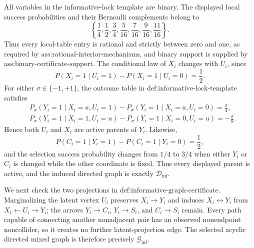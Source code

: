 All variables in the informative-lock template are binary.  The displayed local success probabilities and their Bernoulli complements belong to
\[
 \left\{\frac14,\frac12,\frac34,
              \frac5{16},\frac7{16},\frac9{16},\frac{11}{16}\right\}.
\]
Thus every local-table entry is rational and strictly between zero and one, as required by \(\text{ass:rational-interior-mechanisms}\), and binary support is supplied by \(\text{ass:binary-certificate-support}\).  The conditional law of \(X_i\) changes with \(U_i\), since
\[
 P(X_i=1\mid U_i=1)-P(X_i=1\mid U_i=0)=\frac12.
\]
For either \(\sigma\in\{-1,+1\}\), the outcome table in \(\text{def:informative-lock-template}\) satisfies
\[
 \begin{aligned}
 &P_\sigma(Y_i=1\mid X_i=a,U_i=1)
   -P_\sigma(Y_i=1\mid X_i=a,U_i=0)=\frac{\sigma}{4},\\
 &P_\sigma(Y_i=1\mid X_i=1,U_i=u)
   -P_\sigma(Y_i=1\mid X_i=0,U_i=u)=-\frac{\sigma}{8}.
 \end{aligned}
\]
Hence both \(U_i\) and \(X_i\) are active parents of \(Y_i\).  Likewise,
\[
 P(C_i=1\mid Y_i=1)-P(C_i=1\mid Y_i=0)=\frac12,
\]
and the selection success probability changes from \(1/4\) to \(3/4\) when either \(Y_i\) or \(C_i\) is changed while the other coordinate is fixed.  Thus every displayed parent is active, and the induced directed graph is exactly \(\mathcal D_{\mathrm{inf}}\).

We next check the two projections in \(\text{def:informative-graph-certificate}\).  Marginalizing the latent vertex \(U_i\) preserves \(X_i\to Y_i\) and induces \(X_i\leftrightarrow Y_i\) from \(X_i\leftarrow U_i\to Y_i\); the arrows \(Y_i\to C_i\), \(Y_i\to S_i\), and \(C_i\to S_i\) remain.  Every path capable of connecting another nonadjacent pair has an observed nonendpoint noncollider, so it creates no further latent-projection edge.  The selected acyclic directed mixed graph is therefore precisely \(\mathcal G_{\mathrm{inf}}\).

